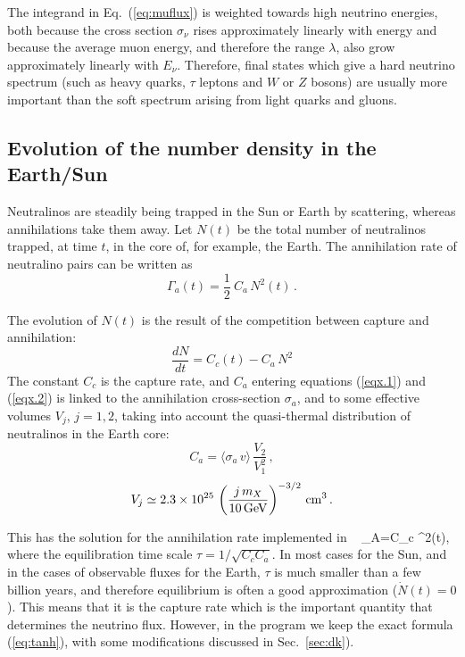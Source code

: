 The integrand in Eq.~(\ref{eq:muflux}) is weighted towards high
neutrino energies, both because the cross section $\sigma_\nu$
rises approximately linearly with energy and because the average
muon energy, and therefore the range $\lambda$, also grow
approximately linearly with $E_\nu$. Therefore, final states
which give a hard neutrino spectrum (such as heavy quarks, $\tau$
leptons and $W$ or $Z$ bosons) are usually more important
than the soft spectrum arising from light quarks and gluons.

\subsection{Evolution of the number density in the Earth/Sun}

Neutralinos are steadily being trapped in the Sun or Earth by
scattering, whereas annihilations take them away.
Let $N(t)$ be the total number of neutralinos trapped, at time $t$, in the core
of, for example,  the Earth.
The annihilation rate of neutralino pairs can be written as
\begin{equation}
\Gamma_a (t) = \frac{1}{2} \ C_a \, N^2 (t) \, . \label{eqx.1}
\end{equation}

The evolution of $N(t)$ is the result of the competition between capture and
annihilation:
\begin{equation}
\frac{dN}{dt} = C_c (t) - C_a \, N^2 \label{eqx.2}
\end{equation}
The constant $C_c$ is the capture rate, and
$C_a$ entering equations (\ref{eqx.1}) and (\ref{eqx.2}) is linked to
the annihilation cross-section $\sigma_a$, and to some effective volumes $V_j$,
$j=1,2$, taking into account the quasi-thermal distribution of neutralinos in
the Earth core:
\begin{equation}
C_a = \langle \sigma_a \, v \rangle \, \frac{V_2 }{ V_1^2} \, , \label{eq6.3}
\end{equation}
\begin{equation}
V_j \simeq 2.3 \times 10^{25} \, \left(\frac{j \, m_X}{ 10 \, {\rm 
GeV}}\right)^{-3/2} \, {\rm
cm}^3 \, . \label{eq6.4}
\end{equation}

This has the solution for the annihilation rate implemented in \ds\
\beq
\Gamma_A={C_c} \tanh^2\left({t\over \tau}\right),\label{eq:tanh}
\eeq
where the equilibration time scale $\tau=1/\sqrt{C_cC_a}$.  In most
cases for the Sun, and in the cases of observable fluxes for the
Earth, $\tau$ is much smaller than a few billion years, and therefore
equilibrium is often a good approximation ($\dot N(t)=0$).
This means
that it is the capture rate which is the important quantity that
determines the neutrino flux. However, in the program we keep the exact
formula (\ref{eq:tanh}), with some
modifications discussed in Sec.~\ref{sec:dk}).


